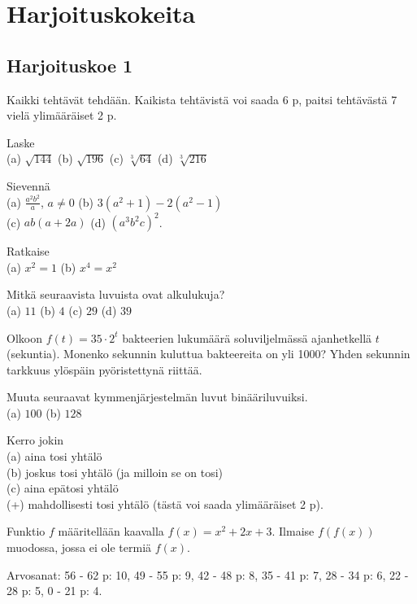 \chapter{Harjoituskokeita}

\section*{Harjoituskoe 1}

\begin{description}
	\item Kaikki tehtävät tehdään. Kaikista tehtävistä voi saada 6 p, paitsi tehtävästä 7 vielä ylimääräiset 2 p.
	\item[1.] Laske \\
	(a) $\sqrt{144}$ \qquad
	(b) $\sqrt{196}$ \qquad
	(c) $\sqrt[3]{64}$ \qquad
	(d) $\sqrt[3]{216}$
	\item[2.] Sievennä \\
	(a) $\frac{a^2 b^2}{a}$, $a \neq 0$ \qquad
	(b) $3(a^2+1)-2(a^2-1)$ \\
	(c) $ab(a+2a)$ \qquad
	(d) $(a^3 b^2 c)^2$.
	\item[3.] Ratkaise \\
	(a) $x^2 = 1$
	(b) $x^4 = x^2$
	\item[4.] Mitkä seuraavista luvuista ovat alkulukuja? \\
	(a) $11$ \qquad
	(b) $4$ \qquad
	(c) $29$ \qquad
	(d) $39$
	\item[5.] Olkoon $f(t) = 35 \cdot 2^t$ bakteerien lukumäärä soluviljelmässä ajanhetkellä $t$ (sekuntia). Monenko sekunnin kuluttua bakteereita on yli 1000? Yhden sekunnin tarkkuus ylöspäin pyöristettynä riittää.
	\item[6.] Muuta seuraavat kymmenjärjestelmän luvut binääriluvuiksi. \\
	(a) $100$ \qquad
	(b) $128$
	\item[7.] Kerro jokin \\
	(a) aina tosi yhtälö \\
	(b) joskus tosi yhtälö (ja milloin se on tosi) \\
	(c) aina epätosi yhtälö \\
	(+) mahdollisesti tosi yhtälö (tästä voi saada ylimääräiset 2 p).
	\item[8.] Funktio $f$ määritellään kaavalla $f(x) = x^2 + 2x + 3$. Ilmaise $f(f(x))$ muodossa, jossa ei ole termiä $f(x)$.
	\item Arvosanat: 56 - 62 p: 10, 49 - 55 p: 9, 42 - 48 p: 8, 35 - 41 p: 7, 28 - 34 p: 6, 22 - 28 p: 5, 0 - 21 p: 4.
\end{description}
